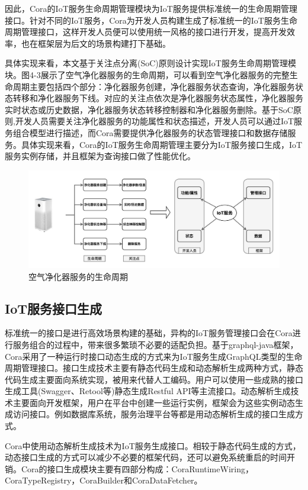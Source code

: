 \documentclass[winfonts,master,twoside]{njuthesis}
\begin{document}
因此，Cora的IoT服务生命周期管理模块为IoT服务提供标准统一的生命周期管理接口。针对不同的IoT服务，Cora为开发人员构建生成了标准统一的IoT服务生命周期管理接口，这样开发人员便可以使用统一风格的接口进行开发，提高开发效率，也在框架层为后文的场景构建打下基础。

具体实现来看，本文基于关注点分离(SoC)原则设计实现IoT服务生命周期管理模块。图4-3展示了空气净化器服务的生命周期，可以看到空气净化器服务的完整生命周期主要包括四个部分：净化器服务创建，净化器服务状态查询，净化器服务状态转移和净化器服务下线。对应的关注点依次是净化器服务状态属性，净化器服务实时状态或历史数据，净化器服务状态转移控制器和净化器服务删除。基于SoC原则,开发人员需要关注净化器服务的功能属性和状态描述，开发人员可以通过IoT服务组合模型进行描述，而Cora需要提供净化器服务的状态管理接口和数据存储服务。具体实现来看，Cora的IoT服务生命周期管理主要分为IoT服务接口生成，IoT服务实例存储，并且框架为查询接口做了性能优化。
\begin{figure}
	\centering
	\includegraphics[width=1.0\textwidth]{figure/4-cora/airpurifier_lifecycle.png}
	\caption{空气净化器服务的生命周期}
	\label{ontransact-impl}
\end{figure}

\subsection{IoT服务接口生成}
标准统一的接口是进行高效场景构建的基础，异构的IoT服务管理接口会在Cora进行服务组合的过程中，带来很多繁琐不必要的适配负担。基于graphql-java框架，Cora采用了一种运行时接口动态生成的方式来为IoT服务生成GraphQL类型的生命周期管理接口。接口生成技术主要有静态代码生成和动态解析生成两种方式，静态代码生成主要面向系统实现，被用来代替人工编码。用户可以使用一些成熟的接口生成工具(Swagger\cite{swagger}、Retool\cite{retool}等)静态生成Restful API\cite{richardson2008restful}等主流接口。动态解析生成技术主要面向开发框架，用户在平台中创建一些运行实例，框架会为这些实例动态生成访问接口。例如数据库系统，服务治理平台等都是用动态解析生成的接口生成方式。

Cora中使用动态解析生成技术为IoT服务生成接口。相较于静态代码生成的方式，动态接口生成的方式可以减少不必要的框架代码，还可以避免系统重启的时间开销。Cora的接口生成模块主要有四部分构成：CoraRuntimeWiring，CoraTypeRegistry，CoraBuilder和CoraDataFetcher。
\end{document}
